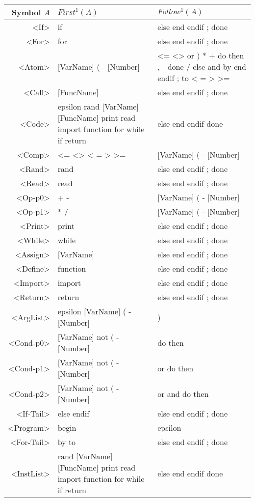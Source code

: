 \begin{longtable}{r p{7cm} p{7cm}}
\textnormal{Symbol} $A$ & $First^1(A)$ & $Follow^1(A)$\\ \hline
<If> & if  & else end endif ; done \\ \hline
<For> & for  & else end endif ; done \\ \hline
<Atom> & [VarName] ( - [Number]  & <= <> or ) * + do then , - done / else and by end endif ; to < = > >= \\ \hline
<Call> & [FuncName]  & else end endif ; done \\ \hline
<Code> & epsilon rand [VarName] [FuncName] print read import function for while if return  & else end endif done \\ \hline
<Comp> & <= <> < = > >=  & [VarName] ( - [Number] \\ \hline
<Rand> & rand  & else end endif ; done \\ \hline
<Read> & read  & else end endif ; done \\ \hline
<Op-p0> & + -  & [VarName] ( - [Number] \\ \hline
<Op-p1> & * /  & [VarName] ( - [Number] \\ \hline
<Print> & print  & else end endif ; done \\ \hline
<While> & while  & else end endif ; done \\ \hline
<Assign> & [VarName]  & else end endif ; done \\ \hline
<Define> & function  & else end endif ; done \\ \hline
<Import> & import  & else end endif ; done \\ \hline
<Return> & return  & else end endif ; done \\ \hline
<ArgList> & epsilon [VarName] ( - [Number]  & ) \\ \hline
<Cond-p0> & [VarName] not ( - [Number]  & do then \\ \hline
<Cond-p1> & [VarName] not ( - [Number]  & or do then \\ \hline
<Cond-p2> & [VarName] not ( - [Number]  & or and do then \\ \hline
<If-Tail> & else endif  & else end endif ; done \\ \hline
<Program> & begin  & epsilon \\ \hline
<For-Tail> & by to  & else end endif ; done \\ \hline
<InstList> & rand [VarName] [FuncName] print read import function for while if return  & else end endif done \\ \hline

\end{longtable}
